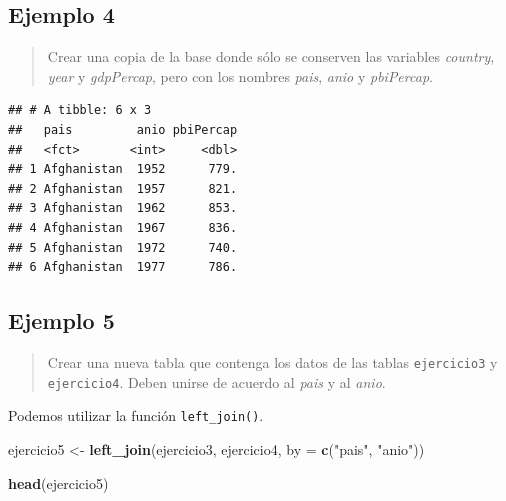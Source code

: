 \documentclass[]{book}
\newenvironment{Shaded}{\begin{snugshade}}{\end{snugshade}}
\newcommand{\DataTypeTok}[1]{\textcolor[rgb]{0.13,0.29,0.53}{#1}}
\newcommand{\KeywordTok}[1]{\textcolor[rgb]{0.13,0.29,0.53}{\textbf{#1}}}
\newcommand{\NormalTok}[1]{#1}
\newcommand{\OperatorTok}[1]{\textcolor[rgb]{0.81,0.36,0.00}{\textbf{#1}}}
\newcommand{\StringTok}[1]{\textcolor[rgb]{0.31,0.60,0.02}{#1}}
\begin{document}
\hypertarget{ejemplo-4}{%
\subsection{Ejemplo 4}\label{ejemplo-4}}

\begin{quote}
Crear una copia de la base donde sólo se conserven las variables \emph{country}, \emph{year} y \emph{gdpPercap}, pero con los nombres \emph{pais}, \emph{anio} y \emph{pbiPercap}.
\end{quote}

\begin{Shaded}
\end{Shaded}

\begin{verbatim}
## # A tibble: 6 x 3
##   pais         anio pbiPercap
##   <fct>       <int>     <dbl>
## 1 Afghanistan  1952      779.
## 2 Afghanistan  1957      821.
## 3 Afghanistan  1962      853.
## 4 Afghanistan  1967      836.
## 5 Afghanistan  1972      740.
## 6 Afghanistan  1977      786.
\end{verbatim}

\hypertarget{ejemplo-5}{%
\subsection{Ejemplo 5}\label{ejemplo-5}}

\begin{quote}
Crear una nueva tabla que contenga los datos de las tablas \texttt{ejercicio3} y \texttt{ejercicio4}. Deben unirse de acuerdo al \emph{pais} y al \emph{anio}.
\end{quote}

Podemos utilizar la función \texttt{left\_join()}.

\begin{Shaded}
\begin{Highlighting}[]
\NormalTok{ejercicio5 <-}\StringTok{ }\KeywordTok{left_join}\NormalTok{(ejercicio3, ejercicio4, }\DataTypeTok{by =} \KeywordTok{c}\NormalTok{(}\StringTok{"pais"}\NormalTok{, }\StringTok{"anio"}\NormalTok{))}

\KeywordTok{head}\NormalTok{(ejercicio5)}
\end{Highlighting}
\end{Shaded}
\end{document}
